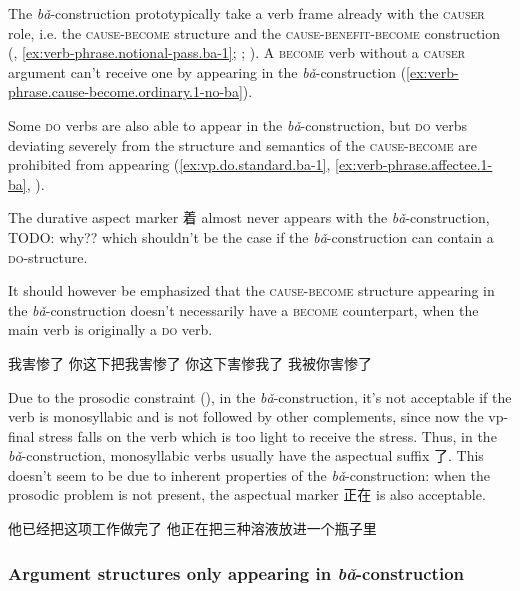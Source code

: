 \documentclass[UTF8, a4paper, oneside, scheme=plain, 12pt]{ctexrep}
\newcommand*{\citepages}[1]{pp.~{#1}}
\newcommand{\form}[1]{\emph{#1}}
\newcommand*{\category}[1]{\textsc{#1}}
\begin{document}
The \form{bǎ}-construction
prototypically take a verb frame already with the \category{causer} role,  
i.e. the \category{cause}-\category{become} structure
and the \category{cause}-\category{benefit}-\category{become} construction
(, 
\ref{ex:verb-phrase.notional-pass.ba-1};
;
\citealt[\citepages{98-99}]{deng2010formal}).
A \category{become} verb without a \category{causer} argument 
can't receive one by appearing in the \form{bǎ}-construction
(\ref{ex:verb-phrase.cause-become.ordinary.1-no-ba}).

Some \category{do} verbs are also able 
to appear in the \form{bǎ}-construction, 
but \category{do} verbs deviating severely from the structure and semantics of  
the \category{cause}-\category{become} 
are prohibited from appearing
(\ref{ex:vp.do.standard.ba-1}, 
\ref{ex:verb-phrase.affectee.1-ba},
).

The durative aspect marker 着 almost never appears 
with the \form{bǎ}-construction, TODO: why?? 
which shouldn't be the case 
if the \form{bǎ}-construction can contain a \category{do}-structure.

It should however be emphasized that the \category{cause}-\category{become} structure 
appearing in the \form{bǎ}-construction 
doesn't necessarily have a \category{become} counterpart,
when the main verb is originally a \category{do} verb.

\begin{exe}
    \ex *我害惨了
    \ex 你这下把我害惨了
    \ex 你这下害惨我了
    \ex 我被你害惨了
\end{exe}

Due to the prosodic constraint (), 
in the \form{bǎ}-construction, 
it's not acceptable if the verb is monosyllabic and is not followed by other complements,
since now the \acs{vp}-final stress 
falls on the verb 
which is too light to receive the stress. 
Thus, in the \form{bǎ}-construction, 
monosyllabic verbs usually have the aspectual suffix 了.
This doesn't seem to be due to inherent properties 
of the \form{bǎ}-construction: 
when the prosodic problem is not present, 
the aspectual marker 正在 is also acceptable.

\begin{exe}
    \ex 他已经把这项工作做完了
    \ex 他正在把三种溶液放进一个瓶子里
\end{exe}

\subsubsection{Argument structures only appearing in \form{bǎ}-construction}
\end{document}
